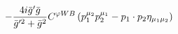 %
\begin{dmath*}
%
  -  \frac{4 i {\bar g}^\prime {\bar g}{}}{{\bar g}^{\prime 2} + {\bar g}{}^2}C^{ \varphi  WB} \left(p_1^{\mu_2} p_2^{\mu_1} - p_{1}\nobreak\cdot\nobreak{}p_{2} \eta_{\mu_1 \mu_2}\right)
%
\end{dmath*}
%
